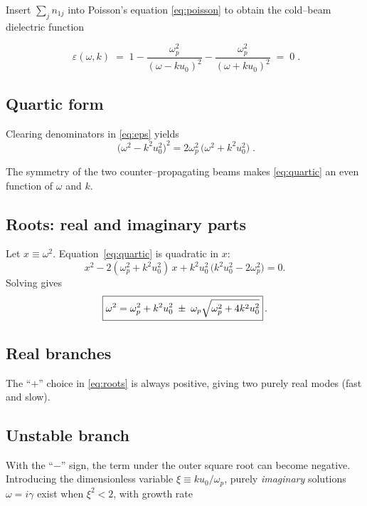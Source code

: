 Insert $\sum_j n_{1j}$ into Poisson's equation \ref{eq:poisson} to obtain the cold--beam dielectric function

\begin{equation}
    \boxed{\;
    \varepsilon(\omega,k) \;=\;
    1 - \frac{\omega_p^{2}}{(\omega - k u_0)^{2}} - \frac{\omega_p^{2}}{(\omega + k u_0)^{2}} \;=\; 0
    \;} .
    \label{eq:eps}
\end{equation}

\subsection{Quartic form}

Clearing denominators in \ref{eq:eps} yields
\begin{equation}
    \boxed{\;
    \bigl(\omega^{2} - k^{2} u_{0}^{2}\bigr)^{2}
    = 2 \omega_{p}^{2}\,\bigl(\omega^{2} + k^{2} u_{0}^{2}\bigr)
    \;} .
    \label{eq:quartic}
\end{equation}

The symmetry of the two counter--propagating beams makes \ref{eq:quartic} an even function of $\omega$ and $k$.

\subsection{Roots: real and imaginary parts}

Let $x \equiv \omega^{2}$.  Equation~\ref{eq:quartic} is quadratic in $x$:
\[
x^{2} - 2(\omega_p^{2} + k^{2} u_{0}^{2})\,x
+ k^{2} u_{0}^{2}\,\bigl(k^{2} u_{0}^{2} - 2\omega_p^{2}\bigr) = 0 .
\]
Solving gives
\begin{equation}
    \boxed{%
    \omega^{2}
    = \omega_p^{2} + k^{2} u_{0}^{2}
    \;\pm\;
    \omega_p \sqrt{\omega_p^{2} + 4 k^{2} u_{0}^{2}}
    }\, .
    \label{eq:roots}
\end{equation}

\subsection*{Real branches}

The ``$+$'' choice in \ref{eq:roots} is always positive, giving two purely real modes (fast and slow).

\subsection*{Unstable branch}

With the ``$-$'' sign, the term under the outer square root can become negative.  Introducing the dimensionless variable
$\xi \equiv k u_0 / \omega_p$,
purely \emph{imaginary} solutions $\omega = i \gamma$ exist when $\xi^{2} < 2$, with growth rate

